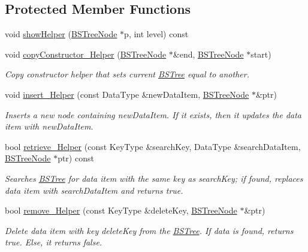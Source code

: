 \subsection*{Protected Member Functions}
\begin{DoxyCompactItemize}
\item 
void \hyperlink{class_b_s_tree_a44b3002e3476eb410468a4b9aaaa73ef}{show\+Helper} (\hyperlink{class_b_s_tree_1_1_b_s_tree_node}{B\+S\+Tree\+Node} $\ast$p, int level) const 
\item 
void \hyperlink{class_b_s_tree_a58f01e37aba1a3589d6a0527e8fd3b2b}{copy\+Constructor\+\_\+\+Helper} (\hyperlink{class_b_s_tree_1_1_b_s_tree_node}{B\+S\+Tree\+Node} $\ast$\&end, \hyperlink{class_b_s_tree_1_1_b_s_tree_node}{B\+S\+Tree\+Node} $\ast$start)
\begin{DoxyCompactList}\small\item\em Copy constructor helper that sets current \hyperlink{class_b_s_tree}{B\+S\+Tree} equal to another. \end{DoxyCompactList}\item 
void \hyperlink{class_b_s_tree_a8db9e377d980f427645c02234f06b550}{insert\+\_\+\+Helper} (const Data\+Type \&new\+Data\+Item, \hyperlink{class_b_s_tree_1_1_b_s_tree_node}{B\+S\+Tree\+Node} $\ast$\&ptr)
\begin{DoxyCompactList}\small\item\em Inserts a new node containing new\+Data\+Item. If it exists, then it updates the data item with new\+Data\+Item. \end{DoxyCompactList}\item 
bool \hyperlink{class_b_s_tree_a331b572e91929d110ea21ec46bc4bcd0}{retrieve\+\_\+\+Helper} (const Key\+Type \&search\+Key, Data\+Type \&search\+Data\+Item, \hyperlink{class_b_s_tree_1_1_b_s_tree_node}{B\+S\+Tree\+Node} $\ast$ptr) const 
\begin{DoxyCompactList}\small\item\em Searches \hyperlink{class_b_s_tree}{B\+S\+Tree} for data item with the same key as search\+Key; if found, replaces data item with search\+Data\+Item and returns true. \end{DoxyCompactList}\item 
bool \hyperlink{class_b_s_tree_ab70fca446ea4c79b1b73a82b96b98d4f}{remove\+\_\+\+Helper} (const Key\+Type \&delete\+Key, \hyperlink{class_b_s_tree_1_1_b_s_tree_node}{B\+S\+Tree\+Node} $\ast$\&ptr)
\begin{DoxyCompactList}\small\item\em Delete data item with key delete\+Key from the \hyperlink{class_b_s_tree}{B\+S\+Tree}. If data is found, returns true. Else, it returns false. \end{DoxyCompactList}\item 

\end{DoxyCompactItemize}
